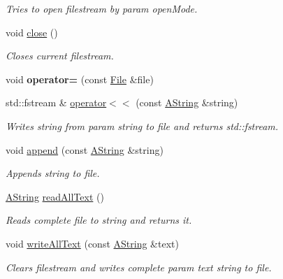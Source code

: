 \begin{DoxyCompactItemize}
\begin{DoxyCompactList}\small\item\em Tries to open filestream by param open\+Mode. \end{DoxyCompactList}\item 
\mbox{\label{class_file_a83cbce54d6c3b8c2f417b51f6b3f488c}} 
void \mbox{\hyperlink{class_file_a83cbce54d6c3b8c2f417b51f6b3f488c}{close}} ()
\begin{DoxyCompactList}\small\item\em Closes current filestream. \end{DoxyCompactList}\item 
\mbox{\label{class_file_a90d8fdab01cefa95038ac94cf058e43b}} 
void {\bfseries operator=} (const \mbox{\hyperlink{class_file}{File}} \&file)
\item 
std\+::fstream \& \mbox{\hyperlink{class_file_ac58f65f7af68645c95050e0faa296bcd}{operator$<$$<$}} (const \mbox{\hyperlink{class_a_string}{A\+String}} \&string)
\begin{DoxyCompactList}\small\item\em Writes string from param string to file and returns std\+::fstream. \end{DoxyCompactList}\item 
void \mbox{\hyperlink{class_file_a7598c356f21d695e7e69fc523500588a}{append}} (const \mbox{\hyperlink{class_a_string}{A\+String}} \&string)
\begin{DoxyCompactList}\small\item\em Appends string to file. \end{DoxyCompactList}\item 
\mbox{\hyperlink{class_a_string}{A\+String}} \mbox{\hyperlink{class_file_ad835c603c110f5e5d8359a9b271298dd}{read\+All\+Text}} ()
\begin{DoxyCompactList}\small\item\em Reads complete file to string and returns it. \end{DoxyCompactList}\item 
void \mbox{\hyperlink{class_file_a3d0bdb094fd754890130f27493792d05}{write\+All\+Text}} (const \mbox{\hyperlink{class_a_string}{A\+String}} \&text)
\begin{DoxyCompactList}\small\item\em Clears filestream and writes complete param text string to file. \end{DoxyCompactList}\item 

\end{DoxyCompactItemize}
